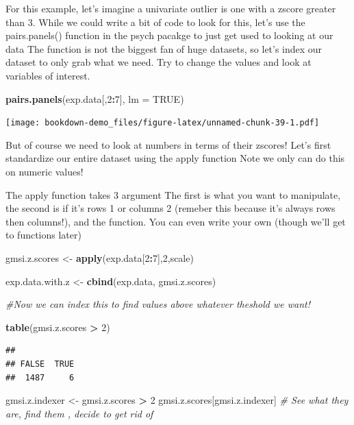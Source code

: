 \documentclass[]{book}
\newenvironment{Shaded}{\begin{snugshade}}{\end{snugshade}}
\newcommand{\KeywordTok}[1]{\textcolor[rgb]{0.13,0.29,0.53}{\textbf{#1}}}
\newcommand{\DataTypeTok}[1]{\textcolor[rgb]{0.13,0.29,0.53}{#1}}
\newcommand{\DecValTok}[1]{\textcolor[rgb]{0.00,0.00,0.81}{#1}}
\newcommand{\StringTok}[1]{\textcolor[rgb]{0.31,0.60,0.02}{#1}}
\newcommand{\CommentTok}[1]{\textcolor[rgb]{0.56,0.35,0.01}{\textit{#1}}}
\newcommand{\OtherTok}[1]{\textcolor[rgb]{0.56,0.35,0.01}{#1}}
\newcommand{\OperatorTok}[1]{\textcolor[rgb]{0.81,0.36,0.00}{\textbf{#1}}}
\newcommand{\NormalTok}[1]{#1}
\theoremstyle{definition}
\theoremstyle{definition}
\theoremstyle{definition}
\theoremstyle{remark}
\begin{document}
For this example, let's imagine a univariate outlier is one with a
zscore greater than 3. While we could write a bit of code to look for
this, let's use the pairs.panels() function in the psych pacakge to just
get used to looking at our data The function is not the biggest fan of
huge datasets, so let's index our dataset to only grab what we need. Try
to change the values and look at variables of interest.

\begin{Shaded}
\begin{Highlighting}[]
\KeywordTok{pairs.panels}\NormalTok{(exp.data[,}\DecValTok{2}\OperatorTok{:}\DecValTok{7}\NormalTok{], }\DataTypeTok{lm =} \OtherTok{TRUE}\NormalTok{)}
\end{Highlighting}
\end{Shaded}

\texttt{[image: bookdown-demo\_files/figure-latex/unnamed-chunk-39-1.pdf]}

But of course we need to look at numbers in terms of their zscores!
Let's first standardize our entire dataset using the apply function Note
we only can do this on numeric values!

The apply function takes 3 argument The first is what you want to
manipulate, the second is if it's rows 1 or columns 2 (remeber this
because it's always rows then columns!), and the function. You can even
write your own (though we'll get to functions later)

\begin{Shaded}
\begin{Highlighting}[]
\NormalTok{gmsi.z.scores <-}\StringTok{ }\KeywordTok{apply}\NormalTok{(exp.data[}\DecValTok{2}\OperatorTok{:}\DecValTok{7}\NormalTok{],}\DecValTok{2}\NormalTok{,scale)}

\NormalTok{exp.data.with.z <-}\StringTok{ }\KeywordTok{cbind}\NormalTok{(exp.data, gmsi.z.scores)}

\CommentTok{#Now we can index this to find values above whatever theshold we want!}

\KeywordTok{table}\NormalTok{(gmsi.z.scores }\OperatorTok{>}\StringTok{ }\DecValTok{2}\NormalTok{)}
\end{Highlighting}
\end{Shaded}

\begin{verbatim}
## 
## FALSE  TRUE 
##  1487     6
\end{verbatim}

\begin{Shaded}
\begin{Highlighting}[]
\NormalTok{gmsi.z.indexer <-}\StringTok{ }\NormalTok{gmsi.z.scores }\OperatorTok{>}\StringTok{ }\DecValTok{2}
\NormalTok{gmsi.z.scores[gmsi.z.indexer] }\CommentTok{# See what they are, find them , decide to get rid of}
\end{Highlighting}
\end{Shaded}
\end{document}
